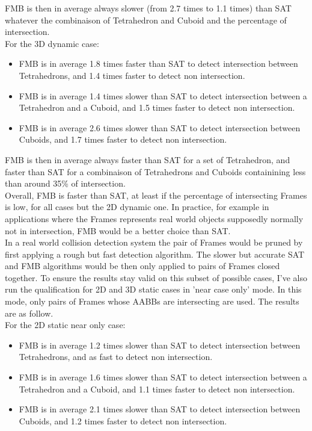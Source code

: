 \documentclass[12pt, a4paper]{article}
\begin{document}
FMB is then in average always slower (from 2.7 times to 1.1 times) than SAT whatever the combinaison of Tetrahedron and Cuboid and the percentage of intersection.\\ 

For the 3D dynamic case:\\

\begin{itemize}
\item FMB is in average 1.8 times faster than SAT to detect intersection between Tetrahedrons, and 1.4 times faster to detect non intersection.\\
\item FMB is in average 1.4 times slower than SAT to detect intersection between a Tetrahedron and a Cuboid, and 1.5 times faster to detect non intersection.\\
\item FMB is in average 2.6 times slower than SAT to detect intersection between Cuboids, and 1.7 times faster to detect non intersection.\\
\end{itemize}

FMB is then in average always faster than SAT for a set of Tetrahedron, and faster than SAT for a combinaison of Tetrahedrons and Cuboids containining less than around 35\% of intersection.\\ 

Overall, FMB is faster than SAT, at least if the percentage of intersecting Frames is low, for all cases but the 2D dynamic one. In practice, for example in applications where the Frames represents real world objects supposedly normally not in intersection, FMB would be a better choice than SAT.\\

In a real world collision detection system the pair of Frames would be pruned by first applying a rough but fast detection algorithm. The slower but accurate SAT and FMB algorithms would be then only applied to pairs of Frames closed together. To ensure the results stay valid on this subset of possible cases, I've also run the qualification for 2D and 3D static cases in 'near case only' mode. In this mode, only pairs of Frames whose AABBs are intersecting are used. The results are as follow.\\

For the 2D static near only case:\\

\begin{itemize}
\item FMB is in average 1.2 times slower than SAT to detect intersection between Tetrahedrons, and as fast to detect non intersection.\\
\item FMB is in average 1.6 times slower than SAT to detect intersection between a Tetrahedron and a Cuboid, and 1.1 times faster to detect non intersection.\\
\item FMB is in average 2.1 times slower than SAT to detect intersection between Cuboids, and 1.2 times faster to detect non intersection.\\
\end{itemize}
\end{document}
